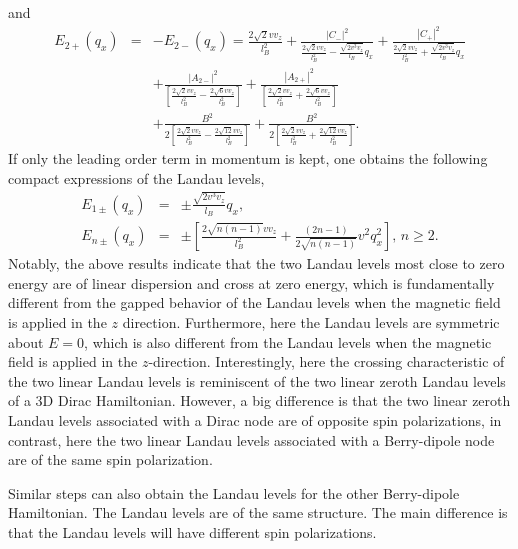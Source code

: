 \documentclass[aps,prl,twocolumn,longbibliography]{revtex4-1}
\begin{document}
\begin{widetext}
and
\begin{eqnarray}
E_{2+}(q_{x})&=&-E_{2-}(q_{x})=\frac{2\sqrt{2}vv_{z}}{l_{B}^{2}}+\frac{|C_{-}|^{2}}{\frac{2\sqrt{2}vv_{z}}{l_{B}^{2}}-\frac{\sqrt{2v^{3}v_{z}}}{l_{B}}q_{x}}
+\frac{|C_{+}|^{2}}{\frac{2\sqrt{2}vv_{z}}{l_{B}^{2}}+\frac{\sqrt{2v^{3}v_{z}}}{l_{B}}q_{x}}\nonumber\\
&&+\frac{|A_{2-}|^{2}}{[\frac{2\sqrt{2}vv_{z}}{l_{B}^{2}}-\frac{2\sqrt{6}vv_{z}}{l_{B}^{2}}]}
+\frac{|A_{2+}|^{2}}{[\frac{2\sqrt{2}vv_{z}}{l_{B}^{2}}+\frac{2\sqrt{6}vv_{z}}{l_{B}^{2}}]}\nonumber\\
&&+\frac{B^{2}}{2[\frac{2\sqrt{2}vv_{z}}{l_{B}^{2}}-\frac{2\sqrt{12}vv_{z}}{l_{B}^{2}}]}
+\frac{B^{2}}{2[\frac{2\sqrt{2}vv_{z}}{l_{B}^{2}}+\frac{2\sqrt{12}vv_{z}}{l_{B}^{2}}]}.
\end{eqnarray}
If only the leading order term in momentum is kept, one obtains the following compact expressions of
the Landau levels,
\begin{eqnarray}
E_{1\pm}(q_{x})&=&\pm\frac{\sqrt{2v^{3}v_{z}}}{l_{B}}q_{x},\nonumber\\
E_{n\pm}(q_{x})&=&\pm[\frac{2\sqrt{n(n-1)}vv_{z}}{l_{B}^{2}}+\frac{(2n-1)}{2\sqrt{n(n-1)}}v^{2}q_{x}^{2}], \, n\geq2.
\end{eqnarray}
Notably, the above results indicate that the two Landau levels most close to zero energy
are of linear dispersion and cross at zero energy, which is fundamentally different from
the gapped behavior of the Landau levels when the magnetic field is applied in the $z$ direction.
Furthermore, here the Landau levels are symmetric about $E=0$, which is also different
from the Landau levels when the magnetic field is applied in the $z$-direction.
Interestingly, here the crossing characteristic of the two linear Landau levels
is reminiscent of the two linear zeroth
Landau levels of a 3D Dirac Hamiltonian. However,
a big difference is that the two linear zeroth Landau levels associated with a Dirac node
are of opposite spin polarizations, in contrast, here the two linear Landau levels associated
with a Berry-dipole node are of the same spin polarization.


Similar steps can also obtain the Landau levels for the other Berry-dipole Hamiltonian. The Landau levels are of the same
structure. The main difference is that the Landau levels will have different spin polarizations.

\end{widetext}
\end{document}
